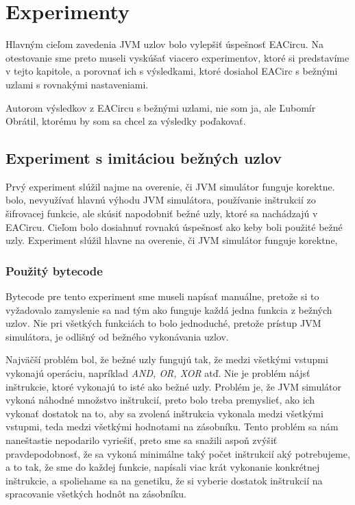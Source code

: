 \chapter{Experimenty}
\label{chap:experiments}

Hlavným cieľom zavedenia JVM uzlov bolo vylepšiť úspešnosť EACircu. Na otestovanie sme preto museli vyskúšať viacero experimentov, ktoré si predstavíme v tejto kapitole, a porovnať ich s výsledkami, ktoré dosiahol EACirc s bežnými uzlami s rovnakými nastaveniami. 

Autorom výsledkov z EACircu s bežnými uzlami, nie som ja, ale Ľubomír Obrátil, ktorému by som sa chcel za výsledky poďakovať.

\section{Experiment s imitáciou bežných uzlov}
\label{sec:exp1}

Prvý experiment slúžil najme na overenie, či JVM simulátor funguje korektne.  bolo, nevyužívať hlavnú výhodu JVM simulátora, používanie inštrukcií zo šifrovacej funkcie, ale skúsiť napodobniť bežné uzly, ktoré sa nachádzajú v EACircu. Cieľom bolo dosiahnuť rovnakú úspešnosť ako keby boli použité bežné uzly. Experiment slúžil hlavne na overenie, či JVM simulátor funguje korektne, 

\subsection{Použitý bytecode}
\label{subsec:exp1-bytecode}

Bytecode pre tento experiment sme museli napísať manuálne, pretože si to vyžadovalo zamyslenie sa nad tým ako funguje každá jedna funkcia z bežných uzlov. Nie pri všetkých funkciách to bolo jednoduché, pretože prístup JVM simulátora, je odlišný od bežného vykonávania uzlov. 

Najväčší problém bol, že bežné uzly fungujú tak, že medzi všetkými vstupmi vykonajú operáciu, napríklad \textit{AND, OR, XOR} atď. Nie je problém nájsť inštrukcie, ktoré vykonajú to isté ako bežné uzly. Problém je, že JVM simulátor vykoná náhodné množstvo inštrukcií, preto bolo treba premyslieť, ako ich vykonať dostatok na to, aby sa zvolená inštrukcia vykonala medzi všetkými vstupmi, teda medzi všetkými hodnotami na zásobníku. Tento problém sa nám naneštastie nepodarilo vyriešiť, preto sme sa snažili aspoň zvýšiť pravdepodobnosť, že sa vykoná minimálne taký počet inštrukcií aký potrebujeme, a to tak, že sme do každej funkcie, napísali viac krát vykonanie konkrétnej inštrukcie, a spoliehame sa na genetiku, že si vyberie dostatok inštrukcií na spracovanie všetkých hodnôt na zásobníku.

